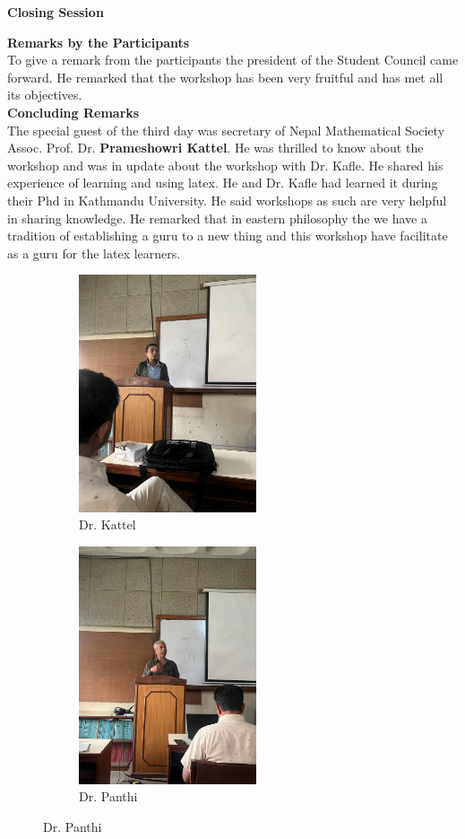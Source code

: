 \documentclass[a4paper,12pt]{report}
\begin{document}
\vspace*{3mm}
\begin{center}
  {\bfseries \Large Closing Session}
\end{center}
\vspace{5mm}

{\bfseries \large Remarks by the Participants}\\[3mm]
To give a remark from the participants the president of the Student Council came forward. He remarked that the workshop has been very fruitful and has met all its objectives.\\[7mm]

{\bfseries \large Concluding Remarks}\\[3mm]
The special guest of the third day was secretary of Nepal Mathematical Society Assoc. Prof. Dr. \textbf{Prameshowri Kattel}. He was thrilled to know about the workshop and was in update about the workshop with Dr. Kafle. He shared his experience of learning and using latex. He and Dr. Kafle had learned it during their Phd in Kathmandu University. He said workshops as such are very helpful in sharing knowledge. He remarked that in eastern philosophy the we have a tradition of establishing a guru to a new thing and this workshop have facilitate as a guru for the latex learners.
\vspace{5mm}

\begin{figure}[h!]
\centering
\begin{subfigure}{0.45\textwidth}
  \includegraphics[height=7cm, width=\textwidth]{pramesh.jpg}
  \caption{Dr. Kattel}
\end{subfigure}
\hfill
\begin{subfigure}{0.45\textwidth}
  \includegraphics[height=7cm, width=\textwidth]{dinesh.jpg}
  \caption{Dr. Panthi}
\end{subfigure}
\end{figure}
\end{document}
